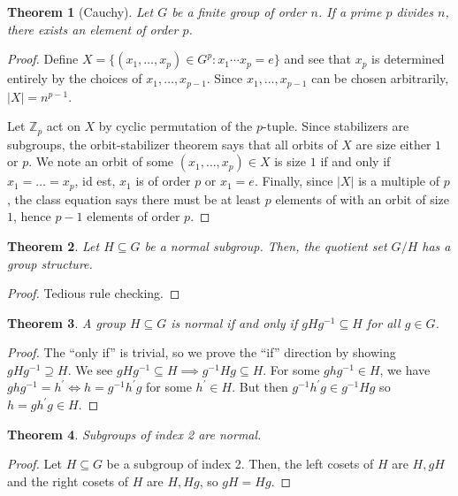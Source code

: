 \documentclass[
    parskip=half,
    toc=flat,
    toc=sectionentrydotfill,
]{scrartcl}  %
\theoremstyle{definition}
\theoremstyle{plain}
\newtheorem{theorem}{Theorem}[section]
\theoremstyle{remark}
\begin{document}
\begin{theorem}[Cauchy]
    Let $G$ be a finite group of order $n$.
    If a prime $p$ divides $n$, there exists an element of order $p$.
\end{theorem}

\begin{proof}
    Define $X=\{(x_1,\dots,x_p)\in G^p:x_1\cdots x_p=e\}$ and see that $x_p$ is determined entirely
    by the choices of $x_1,\dots,x_{p-1}$.
    Since $x_1,\dots,x_{p-1}$ can be chosen arbitrarily, $|X|=n^{p-1}$.

    Let $\mathbb{Z}_p$ act on $X$ by cyclic permutation of the $p$-tuple.
    Since stabilizers are subgroups, the orbit-stabilizer theorem says that all orbits of $X$ are
    size either $1$ or $p$.
    We note an orbit of some $(x_1,\dots,x_p)\in X$ is size $1$ if and only if $x_1=\dots=x_p$, id
    est, $x_1$ is of order $p$ or $x_1=e$.
    Finally, since $|X|$ is a multiple of $p$, the class equation says there must be at least $p$
    elements of with an orbit of size $1$, hence $p-1$ elements of order $p$.
\end{proof}

\begin{theorem}
    Let $H\subseteq G$ be a normal subgroup.
    Then, the quotient set $G/H$ has a group structure.
\end{theorem}

\begin{proof}
    Tedious rule checking.
\end{proof}

\begin{theorem}
    A group $H\subseteq G$ is normal if and only if $gHg^{-1}\subseteq H$ for all $g\in G$.
\end{theorem}

\begin{proof}
    The ``only if'' is trivial, so we prove the ``if'' direction by showing $gHg^{-1}\supseteq H$.
    We see $gHg^{-1}\subseteq H\implies g^{-1}Hg\subseteq H$.
    For some $ghg^{-1}\in H$, we have $ghg^{-1}=h^\prime\iff h=g^{-1}h^\prime g$ for some
    $h^\prime\in H$.
    But then $g^{-1}h^\prime g\in g^{-1}Hg$ so $h=gh^\prime g\in H$.
\end{proof}

\begin{theorem}
    Subgroups of index 2 are normal.
\end{theorem}

\begin{proof}
    Let $H\subseteq G$ be a subgroup of index 2.
    Then, the left cosets of $H$ are $H,gH$ and the right cosets of $H$ are $H,Hg$, so $gH=Hg$.
\end{proof}
\end{document}
